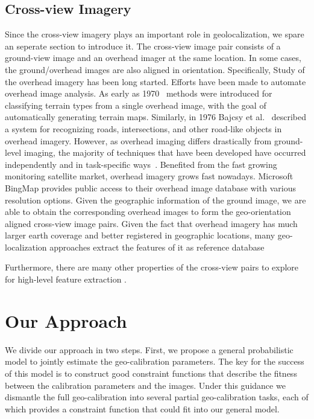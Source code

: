 \subsection{Cross-view Imagery}
Since the cross-view imagery plays an important role in geolocalization,
we spare an seperate section to introduce it. The cross-view image
pair consists of a ground-view image and an overhead imager at the
same location. In some cases, the ground/overhead images are also
aligned in orientation.
Specifically, Study of the overhead imagery has been long started.
Efforts have been made to automate overhead image analysis. As early
as 1970~\cite{idelsohn1970learning} methods were introduced for
classifying terrain types from a single overhead image, with the goal
of automatically generating terrain maps.  Similarly, in 1976 Bajcsy
et al.~\cite{bajcsy1976computer} described a system for recognizing
roads, intersections, and other road-like objects in overhead imagery.
However, as overhead imaging differs drastically from ground-level
imaging, the majority of techniques that have been developed have
occurred independently and in task-specific ways~\cite{Rozen}.
Benefited from the fast growing monitoring satellite market, overhead
imagery grows fast nowadays. Microsoft BingMap provides public access
to their overhead image database with various resolution options.
Given the geographic information of the ground image, we are able to
obtain the corresponding overhead images to form the geo-orientation
aligned cross-view image pairs.
Given the fact that overhead imagery has much larger earth coverage
and better registered in geographic locations, many geo-localization
approaches extract the features of it as reference
database~\cite{lin2013cross,lin2015learning,workman2015geocnn,workman2015wide}

Furthermore, there are many other properties of the cross-view pairs
to explore for high-level feature extraction .


\section{Our Approach}
We divide our approach in two steps. First, we propose a general
probabilistic model to jointly estimate the geo-calibration
parameters. The key for the success of this model is to construct good
constraint functions that describe the fitness between the calibration
parameters and the images. Under this guidance we dismantle the full
geo-calibration into several partial geo-calibration tasks, each of
which provides a constraint function that could fit into our general
model.

